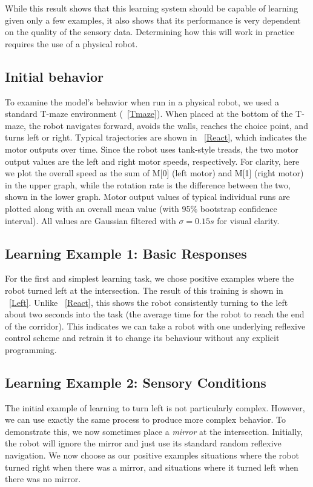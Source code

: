 \documentclass{frontiersSCNS}
\begin{document}
While this result shows that this learning system should be capable of
learning given only a few examples, it also shows that its performance is
very dependent on the quality of the sensory data.  Determining how this
will work in practice requires the use of a physical robot.


\subsection{Initial behavior}

To examine the model's behavior when run in a physical robot, we used a standard T-maze
environment (\figurename~\ref{Tmaze}). When placed at the bottom
of the T-maze, the robot navigates forward, avoids the
walls, reaches the choice point, and turns left or right.
Typical trajectories are shown in \figurename~\ref{React}, which indicates
the motor outputs over time. Since the robot uses tank-style treads, the 
two motor output values are the left and right motor speeds, respectively. 
For clarity, here we plot the overall speed as the sum of M[0] (left motor) 
and M[1] (right motor) in the upper graph, while the rotation rate is the difference between the two,
shown in the lower graph. 
Motor output values of typical individual runs are plotted along with an overall 
mean value (with 95\% bootstrap confidence interval). All values are Gaussian 
filtered with $\sigma=0.15s$ for visual clarity.

\subsection{Learning Example 1: Basic Responses}

For the first and simplest learning task, we chose positive examples
where the robot turned left at the intersection.
The result of this training is shown in \figurename~\ref{Left}. Unlike 
\figurename~\ref{React}, this shows the robot consistently turning to the left about 
two seconds into the task (the average time for the robot to reach the end of the corridor).
This indicates we can take a robot with one underlying reflexive control scheme
and retrain it to change its behaviour without any explicit programming.

\subsection{Learning Example 2: Sensory Conditions} \label{learningConditions}

The initial example of learning to turn left is not particularly complex. 
However, we can use exactly the same process to produce more complex behavior.
To demonstrate this, we now sometimes place a \textit{mirror} at the intersection.
Initially, the robot will ignore the mirror and just use its standard random
reflexive navigation.  We now choose as our positive examples situations where
the robot turned right when there was a mirror, and situations where it turned
left when there was no mirror.
\end{document}
